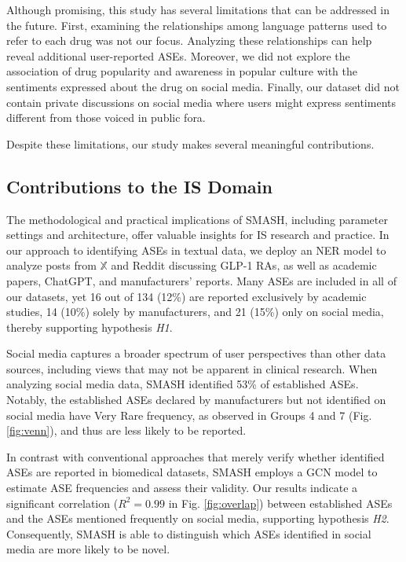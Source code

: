 \documentclass[referee,bst/sn-basic]{sn-jnl}%
\theoremstyle{thmstyletwo}%
\theoremstyle{thmstylethree}%
\begin{document}
Although promising, this study has several limitations that can be addressed in the future.
First, examining the relationships among language patterns used to refer to each drug was not our focus.
Analyzing these relationships can help reveal additional user-reported ASEs.
Moreover, we did not explore the association of drug popularity and awareness in popular culture with the sentiments expressed about the drug on social media.
Finally, our dataset did not contain private discussions on social media where users might express sentiments different from those voiced in public fora.

Despite these limitations, our study makes several meaningful contributions.

\subsection{Contributions to the IS Domain}
The methodological and practical implications of SMASH, including parameter settings and architecture, offer valuable insights for IS research and practice.
In our approach to identifying ASEs in textual data, we deploy an NER model to analyze posts from $\mathbb{X}$ and Reddit discussing GLP-1 RAs, as well as academic papers, ChatGPT, and manufacturers' reports.
Many ASEs are included in all of our datasets, yet 16 out of 134 (12\%) are reported exclusively by academic studies, 14 (10\%) solely by manufacturers, and 21 (15\%) only on social media, thereby supporting hypothesis \textit{H1}.

Social media captures a broader spectrum of user perspectives than other data sources, including views that may not be apparent in clinical research.
When analyzing social media data, SMASH identified 53\% of established ASEs.
Notably, the established ASEs declared by manufacturers but not identified on social media have Very Rare frequency, as observed in Groups 4 and 7 (Fig. \ref{fig:venn}), and thus are less likely to be reported.

In contrast with conventional approaches that merely verify whether identified ASEs are reported in biomedical datasets, SMASH employs a GCN model to estimate ASE frequencies and assess their validity. 
Our results indicate a significant correlation ($R^2=0.99$ in Fig. \ref{fig:overlap}) between established ASEs and the ASEs mentioned frequently on social media, supporting hypothesis \textit{H2}.
Consequently, SMASH is able to distinguish which ASEs identified in social media are more likely to be novel.
\end{document}
